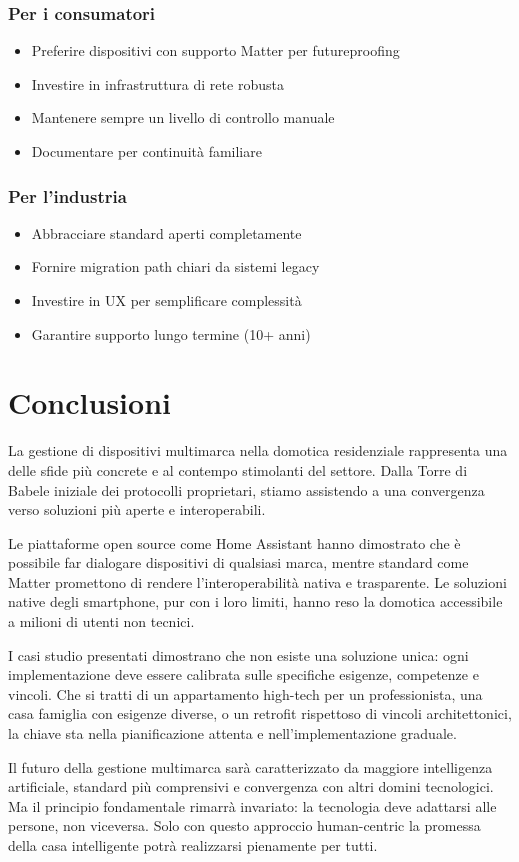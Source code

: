 \subsubsection{Per i consumatori}

\begin{itemize}
    \item Preferire dispositivi con supporto Matter per futureproofing
    \item Investire in infrastruttura di rete robusta
    \item Mantenere sempre un livello di controllo manuale
    \item Documentare per continuità familiare
\end{itemize}

\subsubsection{Per l'industria}

\begin{itemize}
    \item Abbracciare standard aperti completamente
    \item Fornire migration path chiari da sistemi legacy
    \item Investire in UX per semplificare complessità
    \item Garantire supporto lungo termine (10+ anni)
\end{itemize}

\section{Conclusioni}

La gestione di dispositivi multimarca nella domotica residenziale rappresenta una delle sfide più concrete e al contempo stimolanti del settore. Dalla Torre di Babele iniziale dei protocolli proprietari, stiamo assistendo a una convergenza verso soluzioni più aperte e interoperabili.

Le piattaforme open source come Home Assistant hanno dimostrato che è possibile far dialogare dispositivi di qualsiasi marca, mentre standard come Matter promettono di rendere l'interoperabilità nativa e trasparente. Le soluzioni native degli smartphone, pur con i loro limiti, hanno reso la domotica accessibile a milioni di utenti non tecnici.

I casi studio presentati dimostrano che non esiste una soluzione unica: ogni implementazione deve essere calibrata sulle specifiche esigenze, competenze e vincoli. Che si tratti di un appartamento high-tech per un professionista, una casa famiglia con esigenze diverse, o un retrofit rispettoso di vincoli architettonici, la chiave sta nella pianificazione attenta e nell'implementazione graduale.

Il futuro della gestione multimarca sarà caratterizzato da maggiore intelligenza artificiale, standard più comprensivi e convergenza con altri domini tecnologici. Ma il principio fondamentale rimarrà invariato: la tecnologia deve adattarsi alle persone, non viceversa. Solo con questo approccio human-centric la promessa della casa intelligente potrà realizzarsi pienamente per tutti.